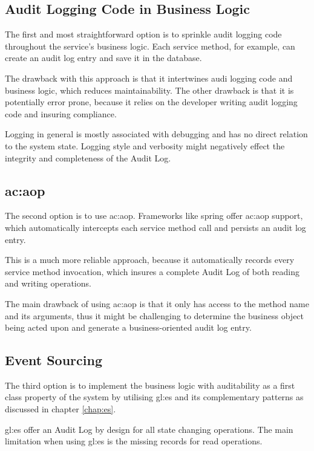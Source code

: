 \subsection{Audit Logging Code in Business Logic}

The first and most straightforward option is to sprinkle audit logging code throughout the service’s business logic. Each service method, for example, can create an audit log entry and save it in the database. 

The drawback with this approach is that it intertwines audi logging code and business logic, which reduces maintainability.
The other drawback is that it is potentially error prone, because it relies on the developer writing audit logging code and insuring compliance.

Logging in general is mostly associated with debugging and has no direct relation to the system state. Logging style and verbosity might negatively effect the integrity and completeness of the Audit Log.

\subsection{\acrlong{ac:aop}}

The second option is to use \gls{ac:aop}. Frameworks like spring offer \gls{ac:aop} support, which automatically intercepts each service method call and persists an audit log entry.

This is a much more reliable approach, because it automatically records every service method invocation, which insures a complete Audit Log of both reading and writing operations.

The main drawback of using \gls{ac:aop} is that it only has access to the method name and its arguments, thus it might be challenging to determine the business object being acted upon and generate a business-oriented audit log entry.

\subsection{Event Sourcing}

The third option is to implement the business logic with auditability as a first class property of the system by utilising \gls{gl:es} and its complementary patterns as discussed in chapter \ref{chap:es}. 

\gls{gl:es} offer an Audit Log by design for all state changing operations. The main limitation when using \gls{gl:es} is the missing records for read operations.

